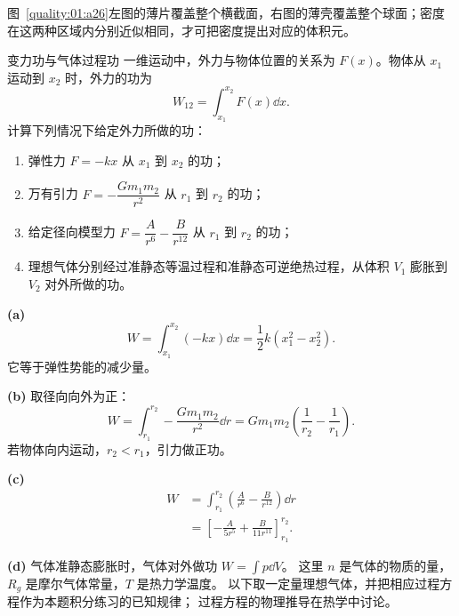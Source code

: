{\begin{xesolution}
图~\ref{quality:01:a26}左图的薄片覆盖整个横截面，右图的薄壳覆盖整个球面；密度在这两种区域内分别近似相同，才可把密度提出对应的体积元。
\end{xesolution}

\begin{origexamplebox}{变力功与气体过程功}\label{ch01:ex:s15-1-22}
一维运动中，外力与物体位置的关系为 $F(x)$。物体从 $x_1$ 运动到 $x_2$ 时，外力的功为
\[
 W_{12}=\int_{x_1}^{x_2}F(x)\dd x.
\]
计算下列情况下给定外力所做的功：
\begin{enumerate}[label=(\alph*),leftmargin=2.2em]
 \item 弹性力 $F=-kx$ 从 $x_1$ 到 $x_2$ 的功；
 \item 万有引力 $F=-\dfrac{Gm_1m_2}{r^2}$ 从 $r_1$ 到 $r_2$ 的功；
 \item 给定径向模型力 $F=\dfrac{A}{r^6}-\dfrac{B}{r^{12}}$ 从 $r_1$ 到 $r_2$ 的功；
 \item 理想气体分别经过准静态等温过程和准静态可逆绝热过程，从体积 $V_1$ 膨胀到 $V_2$ 对外所做的功。
\end{enumerate}

\end{origexamplebox}

\begin{xesolution}
\textbf{(a)}
\[
 W=\int_{x_1}^{x_2}(-kx)\dd x
 =\boxed{\frac12k(x_1^2-x_2^2)}.
\]
它等于弹性势能的减少量。

\textbf{(b)} 取径向向外为正：
\[
 W=\int_{r_1}^{r_2}-\frac{Gm_1m_2}{r^2}\dd r
 =\boxed{Gm_1m_2\left(\frac1{r_2}-\frac1{r_1}\right)}.
\]
若物体向内运动，$r_2<r_1$，引力做正功。

\textbf{(c)}
\begin{align*}
 W&=\int_{r_1}^{r_2}\left(\frac A{r^6}-\frac B{r^{12}}\right)\dd r\\
 &=\boxed{\left[-\frac{A}{5r^5}+\frac{B}{11r^{11}}\right]_{r_1}^{r_2}}.
\end{align*}

\textbf{(d)} 气体准静态膨胀时，气体对外做功 $W=\int p\dd V$。
这里 $n$ 是气体的物质的量，$R_g$ 是摩尔气体常量，$T$ 是热力学温度。
以下取一定量理想气体，并把相应过程方程作为本题积分练习的已知规律；
过程方程的物理推导在热学中讨论。


\end{xesolution}}
